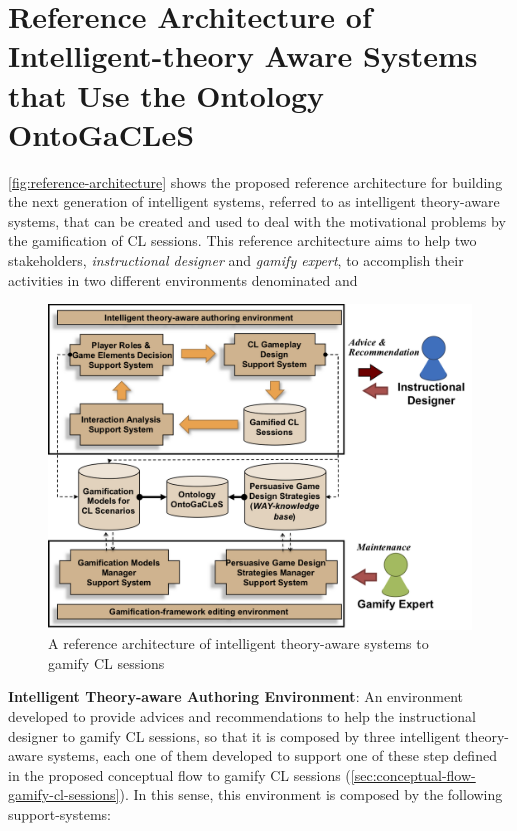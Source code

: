 \section[Reference Architecture of Intelligent-theory Aware
Systems]{Reference Architecture of Intelligent-theory Aware Systems that Use the Ontology OntoGaCLeS}
\label{sec:reference-architecture}

\autoref{fig:reference-architecture} shows the proposed reference architecture for building the next generation of intelligent systems, referred to as intelligent theory-aware systems, that can be created and used to deal with the motivational problems by the gamification of CL sessions.
This reference architecture aims to help two stakeholders, \emph{instructional designer} and \emph{gamify expert}, to accomplish their activities in two different environments denominated  and 

\begin{figure}[htb]
 \caption{A reference architecture of intelligent theory-aware systems to gamify CL sessions}
 \label{fig:reference-architecture}
 \centering
 \includegraphics[width=1\textwidth]{images/chap-mechanisms-procedures/reference-architecture.png} 
 \fautor
\end{figure}

\noindent \textbf{Intelligent Theory-aware Authoring Environment}: An environment developed to provide advices and recommendations to help the instructional designer to gamify CL sessions, so that it is composed by three intelligent theory-aware systems, each one of them developed to support one of these step defined in the proposed conceptual flow to gamify CL sessions (\autoref{sec:conceptual-flow-gamify-cl-sessions}).
In this sense, this environment is composed by the following support-systems:


